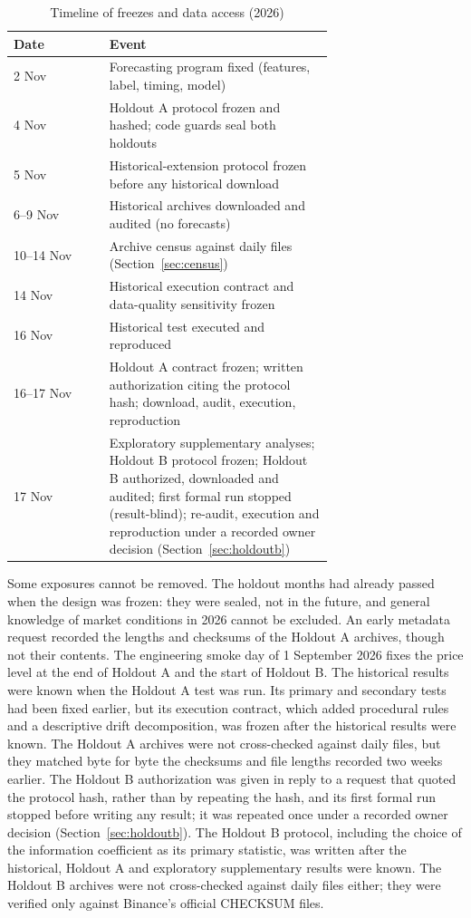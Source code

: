 \documentclass[11pt]{article}
\begin{document}
\begin{table}[ht]\centering\small
\caption{Timeline of freezes and data access (2026)}\label{tab:timeline}
\begin{tabular}{@{}lp{0.70\linewidth}@{}}
\toprule
Date & Event \\
\midrule
2 Nov & Forecasting program fixed (features, label, timing, model) \\
4 Nov & Holdout A protocol frozen and hashed; code guards seal both holdouts \\
5 Nov & Historical-extension protocol frozen before any historical download \\
6--9 Nov & Historical archives downloaded and audited (no forecasts) \\
10--14 Nov & Archive census against daily files (Section~\ref{sec:census}) \\
14 Nov & Historical execution contract and data-quality sensitivity frozen \\
16 Nov & Historical test executed and reproduced \\
16--17 Nov & Holdout A contract frozen; written authorization citing the protocol hash; download, audit, execution, reproduction \\
17 Nov & Exploratory supplementary analyses; Holdout B protocol frozen; Holdout B authorized, downloaded and audited; first formal run stopped (result-blind); re-audit, execution and reproduction under a recorded owner decision (Section~\ref{sec:holdoutb}) \\
\bottomrule
\end{tabular}
\end{table}

Some exposures cannot be removed. The holdout months had already passed when the design was frozen: they were sealed, not in the future, and general knowledge of market conditions in 2026 cannot be excluded. An early metadata request recorded the lengths and checksums of the Holdout A archives, though not their contents. The engineering smoke day of 1 September 2026 fixes the price level at the end of Holdout A and the start of Holdout B. The historical results were known when the Holdout A test was run. Its primary and secondary tests had been fixed earlier, but its execution contract, which added procedural rules and a descriptive drift decomposition, was frozen after the historical results were known. The Holdout A archives were not cross-checked against daily files, but they matched byte for byte the checksums and file lengths recorded two weeks earlier. The Holdout B authorization was given in reply to a request that quoted the protocol hash, rather than by repeating the hash, and its first formal run stopped before writing any result; it was repeated once under a recorded owner decision (Section~\ref{sec:holdoutb}). The Holdout B protocol, including the choice of the information coefficient as its primary statistic, was written after the historical, Holdout A and exploratory supplementary results were known. The Holdout B archives were not cross-checked against daily files either; they were verified only against Binance's official CHECKSUM files.
\end{document}
